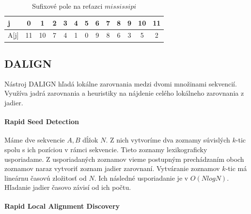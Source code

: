 \begin{table}
    \centering
    \begin{tabular}{ l c c c c c c c c c c c c}
        \toprule
        j&0&1&2&3&4&5&6&7&8&9&10&11 \\
        \midrule
        A[j]&11&10&7&4&1&0&9&8&6&3&5&2 \\
        \toprule
    \end{tabular}
    \caption{Sufixové pole na reťazci $mississipi$}
    \label{table:suffix_array_result}
\end{table}

\subsection{DALIGN}

Nástroj DALIGN \citep{myers2014efficient} hľadá lokálne zarovnania medzi dvomi množinami sekvencií. Využíva jadrá zarovnania a heuristiky na nájdenie celého lokálneho zarovnania z jadier.

\paragraph{Rapid Seed Detection}

Máme dve sekvencie $A, B$ dĺžok $N$. Z nich vytvoríme dva zoznamy súvislých $k$-tic spolu s ich pozíciou v rámci sekvencie. Tieto zoznamy lexikograficky usporiadame. Z usporiadaných zoznamov vieme postupným prechádzaním oboch zoznamov naraz vytvoriť zoznam jadier zarovnaní.
Vytváranie zoznamov $k$-tic má lineárnu časovú zložitosť od $N$. Ich následné usporiadanie je v $O(NlogN)$. Hľadanie jadier časovo závisí od ich počtu.

\paragraph{Rapid Local Alignment Discovery}

